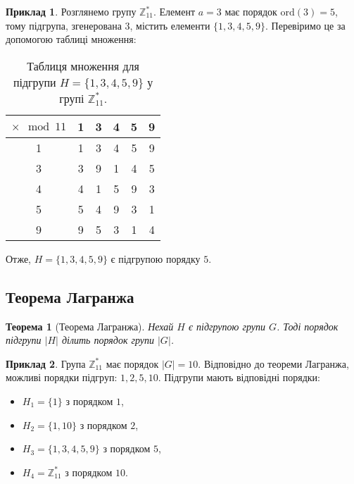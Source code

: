 \documentclass[12pt]{report}
\theoremstyle{definition}
\newtheorem{example}{Приклад}[chapter]
\theoremstyle{plain}
\newtheorem{theorem}{Теорема}[chapter]
\begin{document}
\begin{example}
Розглянемо групу \( \mathbb{Z}^*_{11} \). Елемент \( a = 3 \) має порядок \( \text{ord}(3) = 5 \), тому підгрупа, згенерована \( 3 \), містить елементи \( \{1, 3, 4, 5, 9\} \). Перевіримо це за допомогою таблиці множення:

\begin{table}[h!]
\centering
\begin{tabular}{c|ccccc}
\hline
$\times \mod 11$ & 1 & 3 & 4 & 5 & 9 \\
\hline
1 & 1 & 3 & 4 & 5 & 9 \\
3 & 3 & 9 & 1 & 4 & 5 \\
4 & 4 & 1 & 5 & 9 & 3 \\
5 & 5 & 4 & 9 & 3 & 1 \\
9 & 9 & 5 & 3 & 1 & 4 \\
\hline
\end{tabular}
\caption{Таблиця множення для підгрупи \( H = \{1, 3, 4, 5, 9\} \) у групі \( \mathbb{Z}^*_{11} \).}
\label{tab:multiplication_H}
\end{table}

Отже, \( H = \{1, 3, 4, 5, 9\} \) є підгрупою порядку \( 5 \).
\end{example}

\subsection{Теорема Лагранжа}

\begin{theorem}[Теорема Лагранжа]
Нехай \( H \) є підгрупою групи \( G \). Тоді порядок підгрупи \( |H| \) ділить порядок групи \( |G| \).
\end{theorem}

\begin{example}
Група \( \mathbb{Z}^*_{11} \) має порядок \( |G| = 10 \). Відповідно до теореми Лагранжа, можливі порядки підгруп: \( 1, 2, 5, 10 \). Підгрупи мають відповідні порядки:
\begin{itemize}
    \item \( H_1 = \{1\} \) з порядком \( 1 \),
    \item \( H_2 = \{1, 10\} \) з порядком \( 2 \),
    \item \( H_3 = \{1, 3, 4, 5, 9\} \) з порядком \( 5 \),
    \item \( H_4 = \mathbb{Z}^*_{11} \) з порядком \( 10 \).
\end{itemize}
\end{example}
\end{document}
